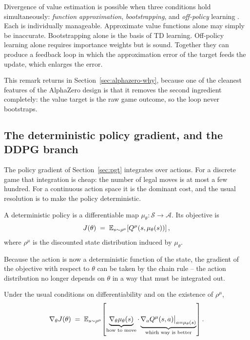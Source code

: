 \begin{remark}
Divergence of value estimation is possible when three conditions hold
simultaneously: \emph{function approximation}, \emph{bootstrapping}, and
\emph{off-policy} learning \citep{suttonbarto2018}. Each is individually
manageable. Approximate value functions alone may simply be inaccurate.
Bootstrapping alone is the basis of TD learning. Off-policy learning alone
requires importance weights but is sound. Together they can produce a feedback
loop in which the approximation error of the target feeds the update, which
enlarges the error.
\end{remark}

This remark returns in Section~\ref{sec:alphazero-why}, because one of the
cleanest features of the AlphaZero design is that it removes the second
ingredient completely: the value target is the raw game outcome, so the loop
never bootstraps.

\subsection{The deterministic policy gradient, and the DDPG branch}
\label{sec:dpg}

The policy gradient of Section~\ref{sec:pgt} integrates over actions. For a
discrete game that integration is cheap: the number of legal moves is at most a
few hundred. For a continuous action space it is the dominant cost, and the
usual resolution is to make the policy deterministic.

\begin{definition}
A deterministic policy is a differentiable map
$\mu_\theta : \mathcal{S} \to \mathcal{A}$. Its objective is
\begin{equation}
J(\theta) \;=\; \mathbb{E}_{s \sim \rho^{\mu}}\!\left[ Q^{\mu}\!\left(s, \mu_\theta(s)\right)\right],
\label{eq:dpg-objective}
\end{equation}
where $\rho^\mu$ is the discounted state distribution induced by $\mu_\theta$.
\end{definition}

Because the action is now a deterministic function of the state, the gradient
of the objective with respect to $\theta$ can be taken by the chain rule -- the
action distribution no longer depends on $\theta$ in a way that must be
integrated out.

\begin{proposition}
\label{prop:dpg}
Under the usual conditions on differentiability and on the existence of
$\rho^\mu$,
\begin{equation}
\nabla_\theta J(\theta) \;=\;
\mathbb{E}_{s \sim \rho^{\mu}}\!\left[
\underbrace{\nabla_\theta \mu_\theta(s)}_{\text{how to move}}
\cdot
\underbrace{\nabla_a Q^{\mu}(s,a)\big|_{a = \mu_\theta(s)}}_{\text{which way is better}}
\right].
\label{eq:dpg}
\end{equation}
\end{proposition}

